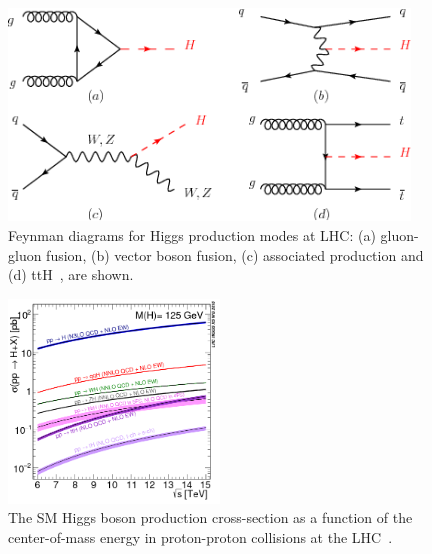 \begin{figure}[hbtp]
 \begin{center}
   \includegraphics[width=0.95\textwidth]{plots_and_figures/chapter2/higgs_prod.png}
   \caption{ Feynman diagrams for Higgs production modes at LHC: (a) gluon-gluon fusion, (b) vector boson fusion, (c) associated production and (d) ttH~\cite{higg_prod}, are shown.}
   \label{fig:higs_feyn}
 \end{center}
\end{figure}


\begin{figure}[hbtp]
 \begin{center}
   \includegraphics[width=0.5\textwidth]{plots_and_figures/chapter2/higgs_xs.png}
   \caption{The SM Higgs boson production cross-section as a function of the center-of-mass energy in proton-proton collisions at the LHC~\cite{higg_prod}.}
   \label{fig:higs_xs_som}
 \end{center}
\end{figure}
    
